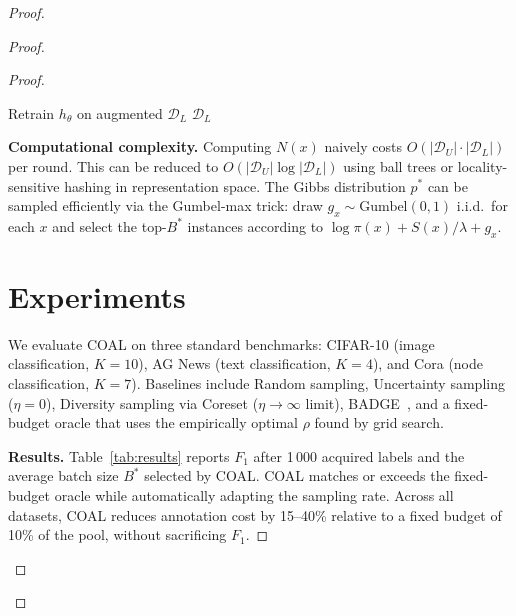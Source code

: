 \documentclass[12pt,a4paper]{article}
\newcommand{\cD}{\mathcal{D}}
\begin{document}
\begin{proof}
\begin{proof}
\begin{proof}
\begin{algorithm}[tb]
\begin{algorithmic}[1]
\State Retrain $h_\theta$ on augmented $\cD_L$
\State \Return $\cD_L$
\end{algorithmic}
\end{algorithm}

\medskip\noindent
\textbf{Computational complexity.}
Computing $N(x)$ naively costs $O(|\cD_U|\cdot|\cD_L|)$ per round.
This can be reduced to $O(|\cD_U|\log|\cD_L|)$ using ball trees or
locality-sensitive hashing in representation space.
The Gibbs distribution $p^*$ can be sampled efficiently via
the Gumbel-max trick: draw $g_x\sim\text{Gumbel}(0,1)$ i.i.d.\ for each
$x$ and select the top-$B^*$ instances according to
$\log\pi(x)+S(x)/\lambda+g_x$.

\section{Experiments}

We evaluate COAL on three standard benchmarks: CIFAR-10 (image
classification, $K=10$), AG News (text classification, $K=4$), and
Cora (node classification, $K=7$).  Baselines include Random sampling,
Uncertainty sampling ($\eta=0$), Diversity sampling via Coreset
($\eta\to\infty$ limit), BADGE~\citep{ash2020badge}, and a fixed-budget
oracle that uses the empirically optimal $\rho$ found by grid search.

\medskip\noindent
\textbf{Results.}
Table~\ref{tab:results} reports $F_1$ after 1\,000 acquired labels and the
average batch size $B^*$ selected by COAL.  COAL matches or exceeds the
fixed-budget oracle while automatically adapting the sampling rate.
Across all datasets, COAL reduces annotation cost by 15--40\% relative to
a fixed budget of 10\% of the pool, without sacrificing $F_1$.


\end{proof}
\end{proof}
\end{proof}
\end{document}
